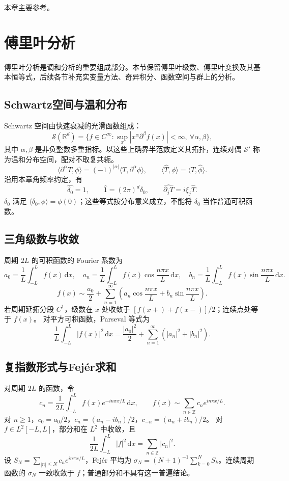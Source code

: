 \documentclass[../main.tex]{subfiles}
\begin{document}
本章主要参考\cite{harmonic,hunter}。

\section{傅里叶分析}
傅里叶分析是调和分析的重要组成部分。本节保留傅里叶级数、傅里叶变换及其基本恒等式，后续各节补充实变量方法、奇异积分、函数空间与群上的分析。
\label{sec:harmonic-fourier}
\subsection{Schwartz空间与温和分布}
Schwartz 空间由快速衰减的光滑函数组成：
\[
\mathcal S(\mathbb R^d)=\{f\in C^\infty:\sup_x|x^\alpha\partial^\beta f(x)|<\infty,
\ \forall\alpha,\beta\},
\]
其中 $\alpha,\beta$ 是非负整数多重指标。以这些上确界半范数定义其拓扑，连续对偶 $\mathcal S'$ 称为温和分布空间，配对不取复共轭。
\[
\langle\partial^\alpha T,\phi\rangle=(-1)^{|\alpha|}\langle T,\partial^\alpha\phi\rangle,
\qquad\langle\widehat T,\phi\rangle=\langle T,\widehat\phi\rangle.
\]
沿用本章角频率约定，有
\[
\widehat{\delta_0}=1,\qquad\widehat1=(2\pi)^d\delta_0,\qquad
\widehat{\partial_jT}=i\xi_j\widehat T.
\]
$\delta_0$ 满足 $\langle\delta_0,\phi\rangle=\phi(0)$；这些等式按分布意义成立，不能将 $\delta_0$ 当作普通可积函数。
\subsection{三角级数与收敛}
周期 $2L$ 的可积函数的 Fourier 系数为
\[
a_0=\frac1L\int_{-L}^Lf(x)\,\mathrm dx,\quad
 a_n=\frac1L\int_{-L}^Lf(x)\cos\frac{n\pi x}L\,\mathrm dx,\quad
 b_n=\frac1L\int_{-L}^Lf(x)\sin\frac{n\pi x}L\,\mathrm dx.
\]
\[
f(x)\sim\frac{a_0}2+\sum_{n=1}^\infty\left(a_n\cos\frac{n\pi x}L+b_n\sin\frac{n\pi x}L\right).
\]
若周期延拓分段 $C^1$，级数在 $x$ 处收敛于 $[f(x+)+f(x-)]/2$；连续点处等于 $f(x)$。
对平方可积函数，Parseval 等式为
\[
\frac1L\int_{-L}^L|f(x)|^2\,\mathrm dx=\frac{|a_0|^2}2+
\sum_{n=1}^\infty(|a_n|^2+|b_n|^2).
\]
\subsection{复指数形式与Fejér求和}
对周期 $2L$ 的函数，令
\[
c_n=\frac1{2L}\int_{-L}^Lf(x)e^{-in\pi x/L}\,\mathrm dx,\qquad
f(x)\sim\sum_{n\in\mathbb Z}c_ne^{in\pi x/L}.
\]
对 $n\ge1$，$c_0=a_0/2$，$c_n=(a_n-ib_n)/2$，$c_{-n}=(a_n+ib_n)/2$。
对 $f\in L^2[-L,L]$，部分和在 $L^2$ 中收敛，且
\[
\frac1{2L}\int_{-L}^L|f|^2\,\mathrm dx=\sum_{n\in\mathbb Z}|c_n|^2.
\]
设 $S_N=\sum_{|n|\le N}c_ne^{in\pi x/L}$，Fejér 平均为 $\sigma_N=(N+1)^{-1}\sum_{k=0}^NS_k$。连续周期函数的 $\sigma_N$ 一致收敛于 $f$；普通部分和不具有这一普遍结论。
\end{document}
